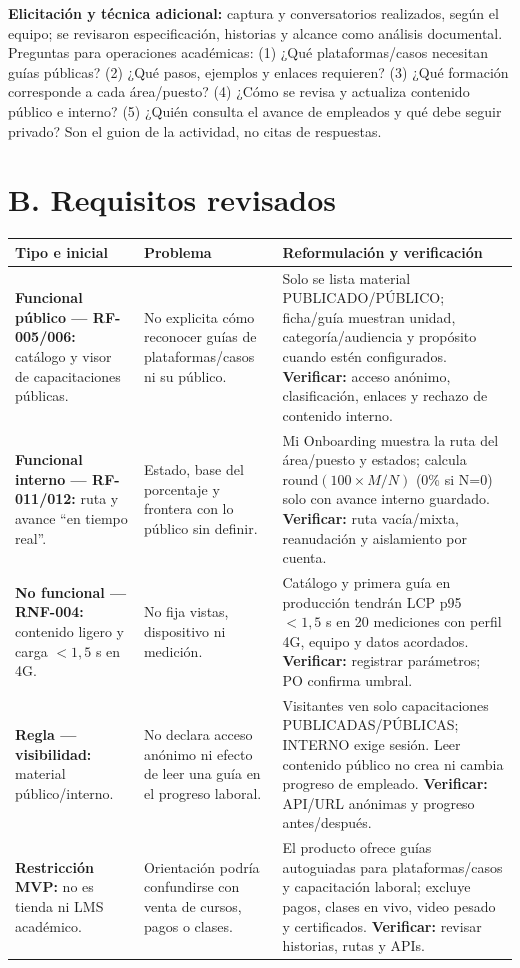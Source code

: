 \documentclass[10pt,a4paper]{extarticle}
\begin{document}
\textbf{Elicitación y técnica adicional:} captura y conversatorios realizados, según el equipo; se revisaron especificación, historias y alcance como análisis documental. Preguntas para operaciones académicas: (1) ¿Qué plataformas/casos necesitan guías públicas? (2) ¿Qué pasos, ejemplos y enlaces requieren? (3) ¿Qué formación corresponde a cada área/puesto? (4) ¿Cómo se revisa y actualiza contenido público e interno? (5) ¿Quién consulta el avance de empleados y qué debe seguir privado? Son el guion de la actividad, no citas de respuestas.

\section*{B. Requisitos revisados}
\footnotesize
\begin{tabularx}{\linewidth}{P{2.8cm} P{3.5cm} Y}
\toprule
Tipo e inicial & Problema & Reformulación y verificación \\
\midrule
\textbf{Funcional público — RF-005/006:} catálogo y visor de capacitaciones públicas. & No explicita cómo reconocer guías de plataformas/casos ni su público. & Solo se lista material PUBLICADO/PÚBLICO; ficha/guía muestran unidad, categoría/audiencia y propósito cuando estén configurados. \textbf{Verificar:} acceso anónimo, clasificación, enlaces y rechazo de contenido interno. \\
\textbf{Funcional interno — RF-011/012:} ruta y avance ``en tiempo real''. & Estado, base del porcentaje y frontera con lo público sin definir. & Mi Onboarding muestra la ruta del área/puesto y estados; calcula $\mathrm{round}(100\times M/N)$ (0\% si N=0) solo con avance interno guardado. \textbf{Verificar:} ruta vacía/mixta, reanudación y aislamiento por cuenta. \\
\textbf{No funcional — RNF-004:} contenido ligero y carga $<1{,}5$ s en 4G. & No fija vistas, dispositivo ni medición. & Catálogo y primera guía en producción tendrán LCP p95 $<1{,}5$ s en 20 mediciones con perfil 4G, equipo y datos acordados. \textbf{Verificar:} registrar parámetros; PO confirma umbral. \\
\textbf{Regla — visibilidad:} material público/interno. & No declara acceso anónimo ni efecto de leer una guía en el progreso laboral. & Visitantes ven solo capacitaciones PUBLICADAS/PÚBLICAS; INTERNO exige sesión. Leer contenido público no crea ni cambia progreso de empleado. \textbf{Verificar:} API/URL anónimas y progreso antes/después. \\
\textbf{Restricción MVP:} no es tienda ni LMS académico. & Orientación podría confundirse con venta de cursos, pagos o clases. & El producto ofrece guías autoguiadas para plataformas/casos y capacitación laboral; excluye pagos, clases en vivo, video pesado y certificados. \textbf{Verificar:} revisar historias, rutas y APIs. \\
\bottomrule
\end{tabularx}
\normalsize
\end{document}
